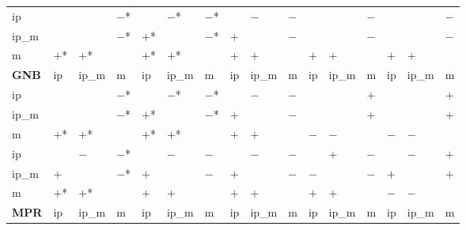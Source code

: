 \begin{table}[htbp]
{\begin{tabular}{l|lll|lll|lll|lll|lll}
\hline
\hline
ip           &            &            & $-$*       &            & $-$*       & $-$*       &            & $-$        & $-$        &            &            & $-$        &            &            & $-$         \\
ip\_m        &            &            & $-$*       & $+$*       &            & $-$*       & $+$        &            & $-$        &            &            & $-$        &            &            & $-$         \\
m            & $+$*       & $+$*       &            & $+$*       & $+$*       &            & $+$        & $+$        &            & $+$        & $+$        &            & $+$        & $+$        &             \\
\hline
\textbf{GNB} & ip         & ip\_m      & m          & ip         & ip\_m      & m          & ip         & ip\_m      & m          & ip         & ip\_m      & m          & ip         & ip\_m      & m           \\
\hline
ip           &            &            & $-$*       &            & $-$*       & $-$*       &            & $-$        & $-$        &            &            & $+$        &            &            & $+$         \\
ip\_m        &            &            & $-$*       & $+$*       &            & $-$*       & $+$        &            & $-$        &            &            & $+$        &            &            & $+$         \\
m            & $+$*       & $+$*       &            & $+$*       & $+$*       &            & $+$        & $+$        &            & $-$        & $-$        &            & $-$        & $-$        &             \\
\hline
\hline
ip           &            & $-$        & $-$*       &            & $-$        & $-$        &            & $-$        & $-$        &            & $+$        & $-$        &            & $-$        & $+$         \\
ip\_m        & $+$        &            & $-$*       & $+$        &            & $-$        & $+$        &            & $-$        & $-$        &            & $-$        & $+$        &            & $+$         \\
m            & $+$*       & $+$*       &            & $+$        & $+$        &            & $+$        & $+$        &            & $+$        & $+$        &            & $-$        & $-$        &             \\
\hline
\textbf{MPR} & ip         & ip\_m      & m          & ip         & ip\_m      & m          & ip         & ip\_m      & m          & ip         & ip\_m      & m          & ip         & ip\_m      & m           \\

\end{tabular}}
\end{table}
